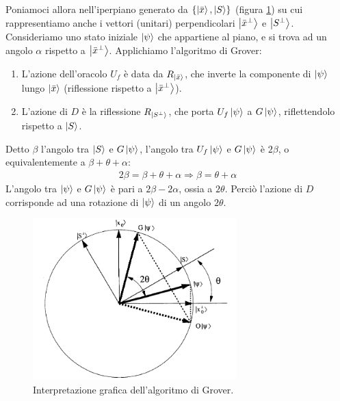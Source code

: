 \documentclass[../../InformazioneQuantistica.tex]{subfiles}
\begin{document}
Poniamoci allora nell'iperpiano generato da $\{\Ket{\bar{x}}, \Ket{S}\}$ (figura \ref{fig:Grover-geom}) su cui rappresentiamo anche i vettori (unitari) perpendicolari $\Ket{\bar{x}^\perp}$ e $\Ket{S^\perp}$. Consideriamo uno stato iniziale $\Ket{\psi}$ che appartiene al piano, e si trova ad un angolo $\alpha$ rispetto a $\Ket{\bar{x}^\perp}$. Applichiamo l'algoritmo di Grover:
\begin{enumerate}
    \item L'azione dell'oracolo $U_f$ è data da $R_{\Ket{\bar{x}}}$, che inverte la componente di $\Ket{\psi}$ lungo $\Ket{\bar{x}}$ (riflessione rispetto a $\Ket{\bar{x}^\perp}$).
    \item L'azione di $D$ è la riflessione $R_{\Ket{S^\perp}}$, che porta $U_f \Ket{\psi}$ a $G\Ket{\psi}$, riflettendolo rispetto a $\Ket{S}$.
\end{enumerate}
Detto $\beta$ l'angolo tra $\Ket{S}$ e $G\Ket{\psi}$, l'angolo tra $U_f \Ket{\psi}$ e $G\Ket{\psi}$ è $2\beta$, o equivalentemente a $\beta + \theta + \alpha$:
\begin{align*}
    2\beta = \beta + \theta + \alpha \Rightarrow \beta = \theta + \alpha
\end{align*}
L'angolo tra $\Ket{\psi}$ e $G\Ket{\psi}$ è pari a $2\beta - 2\alpha$, ossia a $2\theta$. Perciò l'azione di $D$ corrisponde ad una rotazione di $\Ket{\psi}$ di un angolo $2\theta$.

\begin{figure}[H]
\centering
\includegraphics[width=0.7\textwidth]{Immagini/18_4/Grover_geom.PNG}
\caption{Interpretazione grafica dell'algoritmo di Grover.\label{fig:Grover-geom}}
\end{figure}
\end{document}

